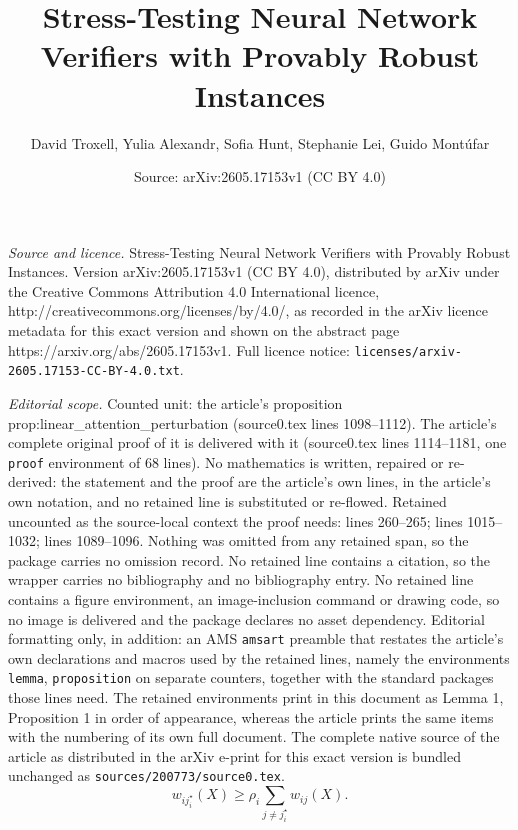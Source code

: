 \documentclass[10pt,a4paper]{amsart}
\title{Stress-Testing Neural Network Verifiers with Provably Robust Instances}
\author{David Troxell, Yulia Alexandr, Sofia Hunt, Stephanie Lei, Guido Mont\'ufar}
\date{Source: arXiv:2605.17153v1 (CC BY 4.0)}
\begin{document}
\maketitle

\noindent\emph{Source and licence.} Stress-Testing Neural Network Verifiers with Provably Robust Instances. Version arXiv:2605.17153v1 (CC BY 4.0), distributed by arXiv under the Creative Commons Attribution 4.0 International licence, http://creativecommons.org/licenses/by/4.0/, as recorded in the arXiv licence metadata for this exact version and shown on the abstract page https://arxiv.org/abs/2605.17153v1. Full licence notice: \texttt{licenses/arxiv-2605.17153-CC-BY-4.0.txt}.\par\smallskip

\noindent\textit{Editorial scope.} Counted unit: the article's proposition prop:linear\_attention\_perturbation (source0.tex lines 1098--1112). The article's complete original proof of it is delivered with it (source0.tex lines 1114--1181, one \texttt{proof} environment of 68 lines). No mathematics is written, repaired or re-derived: the statement and the proof are the article's own lines, in the article's own notation, and no retained line is substituted or re-flowed.  Retained uncounted as the source-local context the proof needs: lines 260--265; lines 1015--1032; lines 1089--1096.  Nothing was omitted from any retained span, so the package carries no omission record.  No retained line contains a citation, so the wrapper carries no bibliography and no bibliography entry.  No retained line contains a figure environment, an image-inclusion command or drawing code, so no image is delivered and the package declares no asset dependency.  Editorial formatting only, in addition: an AMS \texttt{amsart} preamble that restates the article's own declarations and macros used by the retained lines, namely the environments \texttt{lemma}, \texttt{proposition} on separate counters, together with the standard packages those lines need.  The retained environments print in this document as Lemma 1, Proposition 1 in order of appearance, whereas the article prints the same items with the numbering of its own full document.  The complete native source of the article as distributed in the arXiv e-print for this exact version is bundled unchanged as \texttt{sources/200773/source0.tex}.
\begin{equation}
    w_{i j_i^\star}(X)
    \geq
    \rho_i \sum_{j\neq j_i^\star} w_{ij}(X).
    \label{eq:linear_attention_dominance}
\end{equation}
\end{document}
